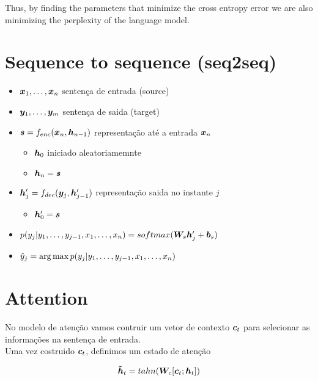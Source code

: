 Thus, by finding the parameters that minimize the cross entropy error we are also minimizing the perplexity of the language model. 





\section{Sequence to sequence (seq2seq)}
\label{sec:Seq2seq}

\begin{itemize}
\item $\bm{x}_1, \dots, \bm{x}_n$ sentença de entrada (source)
\item $\bm{y}_1, \dots, \bm{y}_m$ sentença de saida (target)
\item $\bm{s} = f_{enc}(\bm{x}_n, \bm{h}_{n-1})$ representação  até a entrada $\bm{x}_n$
\begin{itemize}
\item $\bm{h}_0$ iniciado aleatoriamemnte
\item $\bm{h}_n = \bm{s}$  
\end{itemize}
\item $\bm{h}^{\prime}_j = f_{dec}(\bm{y}_j, \bm{h}^{\prime}_{j-1})$ representação saida no instante $j$
\begin{itemize}
\item $\bm{h}^{\prime}_0 = \bm{s}$
\end{itemize}

\item $p(y_j | y_1, \dots, y_{j-1}, x_1, \dots, x_{n}) = softmax(\bm{W}_{s}  \bm{h}^{\prime}_j + \bm{b}_s)$
\item $\hat{y}_j = \operatorname*{arg\,max} p(y_j | y_1, \dots, y_{j-1}, x_1, \dots, x_{n})$

\end{itemize}



\section{Attention}
\label{sec:Attention}

 No modelo de atenção vamos contruir um vetor de contexto $\bm{c}_t$ para selecionar as informações na sentença de entrada.\\
 Uma vez costruido $\bm{c}_t$, definimos um estado de atenção

\begin{equation}
\bm{\tilde{h}}_t = tahn(\bm{W}_c[\bm{c}_t;\bm{h}_t])
\end{equation}

